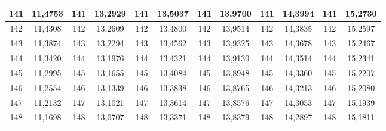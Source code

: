 \documentclass[a4paper,12pt]{article} %
\begin{document}
\begin{longtable}[c]{cccccccccc|c|c|}
	\multicolumn{1}{|c|}{141} & \multicolumn{1}{c|}{11,4753} & \multicolumn{1}{c|}{141} & \multicolumn{1}{c|}{13,2929} & \multicolumn{1}{c|}{141} & \multicolumn{1}{c|}{13,5037} & \multicolumn{1}{c|}{141} & \multicolumn{1}{c|}{13,9700} & \multicolumn{1}{c|}{141} & 14,3994 & 141 & 15,2730 \\ \hline
	\multicolumn{1}{|c|}{142} & \multicolumn{1}{c|}{11,4308} & \multicolumn{1}{c|}{142} & \multicolumn{1}{c|}{13,2609} & \multicolumn{1}{c|}{142} & \multicolumn{1}{c|}{13,4800} & \multicolumn{1}{c|}{142} & \multicolumn{1}{c|}{13,9514} & \multicolumn{1}{c|}{142} & 14,3835 & 142 & 15,2597 \\ \hline
	\multicolumn{1}{|c|}{143} & \multicolumn{1}{c|}{11,3874} & \multicolumn{1}{c|}{143} & \multicolumn{1}{c|}{13,2294} & \multicolumn{1}{c|}{143} & \multicolumn{1}{c|}{13,4562} & \multicolumn{1}{c|}{143} & \multicolumn{1}{c|}{13,9325} & \multicolumn{1}{c|}{143} & 14,3678 & 143 & 15,2467 \\ \hline
	\multicolumn{1}{|c|}{144} & \multicolumn{1}{c|}{11,3420} & \multicolumn{1}{c|}{144} & \multicolumn{1}{c|}{13,1976} & \multicolumn{1}{c|}{144} & \multicolumn{1}{c|}{13,4321} & \multicolumn{1}{c|}{144} & \multicolumn{1}{c|}{13,9130} & \multicolumn{1}{c|}{144} & 14,3514 & 144 & 15,2341 \\ \hline
	\multicolumn{1}{|c|}{145} & \multicolumn{1}{c|}{11,2995} & \multicolumn{1}{c|}{145} & \multicolumn{1}{c|}{13,1655} & \multicolumn{1}{c|}{145} & \multicolumn{1}{c|}{13,4084} & \multicolumn{1}{c|}{145} & \multicolumn{1}{c|}{13,8948} & \multicolumn{1}{c|}{145} & 14,3360 & 145 & 15,2207 \\ \hline
	\multicolumn{1}{|c|}{146} & \multicolumn{1}{c|}{11,2554} & \multicolumn{1}{c|}{146} & \multicolumn{1}{c|}{13,1339} & \multicolumn{1}{c|}{146} & \multicolumn{1}{c|}{13,3838} & \multicolumn{1}{c|}{146} & \multicolumn{1}{c|}{13,8765} & \multicolumn{1}{c|}{146} & 14,3213 & 146 & 15,2080 \\ \hline
	\multicolumn{1}{|c|}{147} & \multicolumn{1}{c|}{11,2132} & \multicolumn{1}{c|}{147} & \multicolumn{1}{c|}{13,1021} & \multicolumn{1}{c|}{147} & \multicolumn{1}{c|}{13,3614} & \multicolumn{1}{c|}{147} & \multicolumn{1}{c|}{13,8576} & \multicolumn{1}{c|}{147} & 14,3053 & 147 & 15,1939 \\ \hline
	\multicolumn{1}{|c|}{148} & \multicolumn{1}{c|}{11,1698} & \multicolumn{1}{c|}{148} & \multicolumn{1}{c|}{13,0707} & \multicolumn{1}{c|}{148} & \multicolumn{1}{c|}{13,3371} & \multicolumn{1}{c|}{148} & \multicolumn{1}{c|}{13,8379} & \multicolumn{1}{c|}{148} & 14,2897 & 148 & 15,1811 \\ \hline

\end{longtable}
\end{document}
